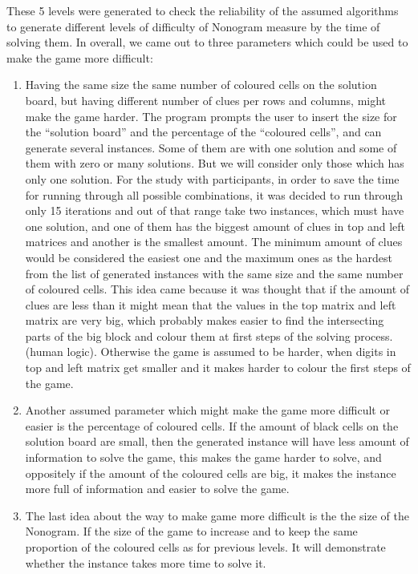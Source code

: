 These 5 levels were generated to check the reliability of the assumed algorithms to generate different levels of difficulty of Nonogram measure by the time of solving them. In overall, we came out to three parameters which could be used to make the game more difficult:

\begin{enumerate}
    \item Having the same size the same number of coloured cells on the solution board, but having different number of clues per rows and columns, might make the game harder. 
    The program prompts the user to insert the size for the “solution board” and the percentage of the “coloured cells”, and can generate several instances. Some of them are with one solution and some of them with zero or many solutions. But we will consider only those which has only one solution.
    For the study with participants, in order to save the time for running through all possible combinations, it was decided to run through only 15 iterations and out of that range take two instances, which must have one solution, and one of them has the biggest amount of clues in top and left matrices and another is the smallest amount. The minimum amount of clues would be considered the easiest one and the maximum ones as the hardest from the list of generated instances with the same size and the same number of coloured cells. 
    This idea came because it was thought that if the amount of clues are less than it might mean that the values in the top matrix and left matrix are very big, which probably makes easier to find the intersecting parts of the big block and colour them at first steps of the solving process. (human logic). Otherwise the game is assumed to be harder, when digits in top and left matrix get smaller and it makes harder to colour the first steps of the game. 

    \item Another assumed parameter which might make the game more difficult or easier is the percentage of coloured cells. If the amount of black cells on the solution board are small, then the generated instance will have less amount of information to solve the game, this makes the game harder to solve, and oppositely if the amount of the coloured cells are big, it makes the instance more full of information and easier to solve the game.

    \item The last idea about the way to make game more difficult is the the size of the Nonogram. If the size of the game to increase and to keep the same proportion of the coloured cells as for previous levels. It will demonstrate whether the instance takes more time to solve it.
\end{enumerate}

